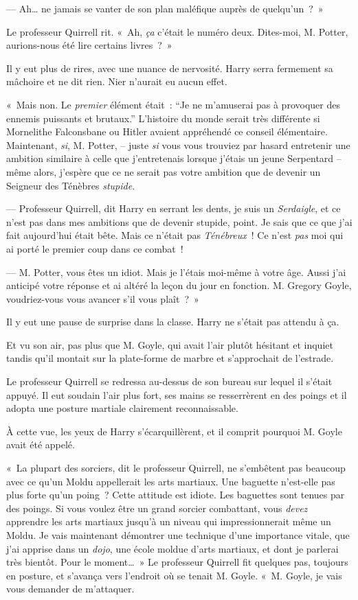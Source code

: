 --- Ah… ne jamais se vanter de son plan maléfique auprès de quelqu'un~?~»

Le professeur Quirrell rit. «~Ah, \emph{ça} c'était le numéro deux. Dites-moi, M. Potter, aurions-nous été lire certains livres~?~»

Il y eut plus de rires, avec une nuance de nervosité. Harry serra fermement sa mâchoire et ne dit rien. Nier n'aurait eu aucun effet.

«~Mais non. Le \emph{premier} élément était~: “Je ne m'amuserai pas à provoquer des ennemis puissants et brutaux.” L'histoire du monde serait très différente si Mornelithe Falconsbane ou Hitler avaient appréhendé ce conseil élémentaire. Maintenant, \emph{si}, M. Potter, -- juste \emph{si} vous vous trouviez par hasard entretenir une ambition similaire à celle que j'entretenais lorsque j'étais un jeune Serpentard -- même alors, j'espère que ce ne serait pas votre ambition que de devenir un Seigneur des Ténèbres \emph{stupide}.

--- Professeur Quirrell, dit Harry en serrant les dents, je suis un \emph{Serdaigle}, et ce n'est pas dans mes ambitions que de devenir stupide, point. Je sais que ce que j'ai fait aujourd'hui était bête. Mais ce n'était pas \emph{Ténébreux}~! Ce n'est \emph{pas} moi qui ai porté le premier coup dans ce combat~!

--- M. Potter, vous êtes un idiot. Mais je l'étais moi-même à votre âge. Aussi j'ai anticipé votre réponse et ai altéré la leçon du jour en fonction. M. Gregory Goyle, voudriez-vous vous avancer s'il vous plaît~?~»

Il y eut une pause de surprise dans la classe. Harry ne s'était pas attendu à ça.

Et vu son air, pas plus que M. Goyle, qui avait l'air plutôt hésitant et inquiet tandis qu'il montait sur la plate-forme de marbre et s'approchait de l'estrade.

Le professeur Quirrell se redressa au-dessus de son bureau sur lequel il s'était appuyé. Il eut soudain l'air plus fort, ses mains se resserrèrent en des poings et il adopta une posture martiale clairement reconnaissable.

À cette vue, les yeux de Harry s'écarquillèrent, et il comprit pourquoi M. Goyle avait été appelé.

«~La plupart des sorciers, dit le professeur Quirrell, ne s'embêtent pas beaucoup avec ce qu'un Moldu appellerait les arts martiaux. Une baguette n'est-elle pas plus forte qu'un poing~? Cette attitude est idiote. Les baguettes sont tenues par des poings. Si vous voulez être un grand sorcier combattant, vous \emph{devez} apprendre les arts martiaux jusqu'à un niveau qui impressionnerait même un Moldu. Je vais maintenant démontrer une technique d'une importance vitale, que j'ai apprise dans un \emph{dojo}, une école moldue d'arts martiaux, et dont je parlerai très bientôt. Pour le moment…~» Le professeur Quirrell fit quelques pas, toujours en posture, et s'avança vers l'endroit où se tenait M. Goyle. «~M. Goyle, je vais vous demander de m'attaquer.

